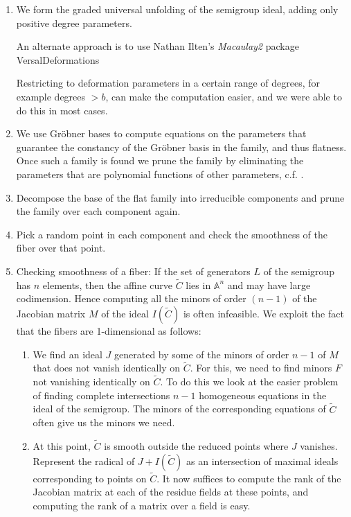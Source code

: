 \documentclass[twoside,12pt, leqno]{amsart}
\theoremstyle{definition}
\def\AA{{\mathbb A}}
\begin{document}
\begin{enumerate}
\item We form the graded universal unfolding of the semigroup ideal, adding only positive degree parameters.

An alternate approach is to use Nathan Ilten's {\it Macaulay2} package VersalDeformations \cite{VersalDeformationsSource, VersalDeformationsArticle}

Restricting to deformation parameters in a certain range of degrees, for example degrees $>b$, can make the computation
easier, and we were able to do this in most cases.

\item We use Gr\"obner bases to compute equations on the parameters that guarantee the constancy
of the Gr\"obner basis in the family, and thus flatness. Once such a family is found we prune the family
by eliminating the parameters
that are polynomial functions of other parameters, c.f. \cite{MR713093}.
\item Decompose the  base of the flat family into irreducible components and prune 
the family over each component again.
\item Pick a random point in each component and check the smoothness of the fiber over that point.

\item Checking smoothness of a fiber: If the set of generators $L$ of the semigroup has $n$ elements, then the affine curve $\widetilde C$ lies in $\AA^{n}$ and may have large codimension.  Hence computing all the minors of order $(n-1)$ of the Jacobian matrix $M$ of the ideal $I(\widetilde C)$ is often infeasible. We exploit the fact that the fibers are  1-dimensional as follows:

\begin{enumerate}
\item We find an ideal $J$ generated by some of the minors of order $n-1$ of $M$ that does not vanish identically on $\widetilde C$. 
For this, we need to find  minors $F$ not vanishing identically on $\widetilde C$.
To do this we look at the easier problem of finding complete intersections  $n-1$ homogeneous equations in the ideal of the semigroup. The minors of the corresponding equations of $\widetilde C$ often give us the  minors we need.


\item At this point, $\widetilde C$ is smooth outside the reduced points where $J$ vanishes. 
Represent the radical of  $J + I(\widetilde C)$
as an intersection of maximal ideals corresponding to points on $\widetilde C$.
 It now suffices to compute the rank of the Jacobian matrix at each of the 
  residue fields at these points, and computing the rank of a matrix over a field is easy.


\end{enumerate}
\end{enumerate}
\end{document}
